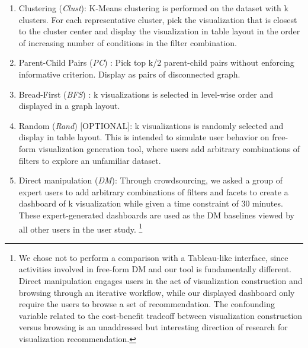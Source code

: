 \begin{enumerate}
	\item Clustering (\textit{Clust}): K-Means clustering is performed on the dataset with k clusters. For each representative cluster, pick the visualization that is closest to the cluster center and display the visualization in table layout in the order of increasing number of conditions in the filter combination.
	\item Parent-Child Pairs (\textit{PC}) : Pick top k/2 parent-child pairs without enforcing informative criterion. Display as pairs of disconnected graph.
	\item Bread-First (\textit{BFS}) : k visualizations is selected in level-wise order and displayed in a graph layout. 
	\item Random (\textit{Rand}) [OPTIONAL]: k visualizations is randomly selected and display in table layout. This is intended to simulate user behavior on free-form visualization generation tool, where users add arbitrary combinations of filters to explore an unfamiliar dataset.
	\item Direct manipulation (\textit{DM}): Through crowdsourcing, we asked a group of expert users to add arbitrary combinations of filters and facets to create a dashboard of k visualization while given a time constraint of 30 minutes. These expert-generated dashboards are used as the DM baselines viewed by all other users in the user study. \footnote{We chose not to perform a comparison with a Tableau-like interface, since activities involved in free-form DM and our tool is fundamentally different. Direct manipulation engages users in the act of visualization construction and browsing through an iterative workflow, while our displayed dashboard only require the users to browse a set of recommendation. The confounding variable related to the cost-benefit tradeoff between visualization construction versus browsing is an unaddressed but interesting direction of research for visualization recommendation.}
\end{enumerate}
